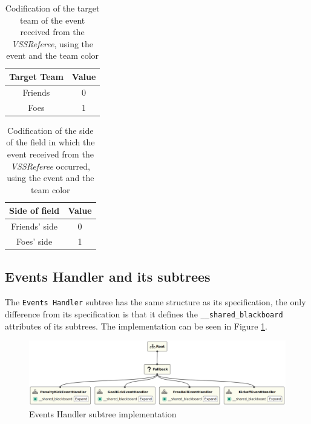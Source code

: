 \begin{table}[!htbp]
    \centering
    \begin{tabular}{c c}
        \toprule
        Target Team & Value \\
        \midrule
        Friends     & 0     \\
        Foes        & 1     \\
        \bottomrule
    \end{tabular}
    \caption{Codification of the target team of the event received from the \textit{VSSReferee}, using the event and the team color}
    \label{tab:target_team_event_codification}
\end{table}

\begin{table}[!htbp]
    \centering
    \begin{tabular}{c c}
        \toprule
        Side of field & Value \\
        \midrule
        Friends' side & 0     \\
        Foes' side    & 1     \\
        \bottomrule
    \end{tabular}
    \caption{Codification of the side of the field in which the event received from the \textit{VSSReferee} occurred, using the event and the team color}
    \label{tab:field_side_event_codification}
\end{table}

\subsection{Events Handler and its subtrees}

The \texttt{Events Handler} subtree has the same structure as its specification, the only difference from its specification is that it defines the \texttt{\_\_shared\_blackboard} attributes of its subtrees. The implementation can be seen in Figure \ref{fig:events_handler_impl}.

\begin{figure}[!h]
    \centering
    \includegraphics[width=1.0\linewidth]{chapters/development/images/EventsHandler.png}
    \caption{Events Handler subtree implementation}
    \label{fig:events_handler_impl}
\end{figure}

